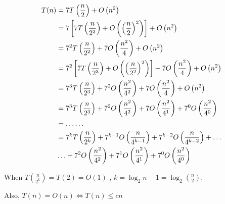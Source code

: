 \documentclass[journal]{IEEEtran}
\begin{document}
\begin{align}
  \notag
  T(n) &=7 T\left(\frac{n}{2}\right)+O\left(n^{2}\right) \\\notag
&=7\left[7 T\left(\frac{n}{2^{2}}\right)+O\left(\left(\frac{n}{2}\right)^{2}\right)\right]+O\left(n^{2}\right) \\\notag
&=7^{2} T\left(\frac{n}{2^{2}}\right)+7 O\left(\frac{n^{2}}{4}\right)+O\left(n^{2}\right) \\\notag
&=7^{2}\left[7 T\left(\frac{n}{2^{3}}\right)+O\left(\left(\frac{n}{2^{2}}\right)^{2}\right)\right]+7 O\left(\frac{n^{2}}{4}\right)+O\left(n^{2}\right) \\\notag
&=7^{3} T\left(\frac{n}{2^{3}}\right)+7^{2} O\left(\frac{n^{2}}{4^{2}}\right)+7 O\left(\frac{n^{2}}{4}\right)+O\left(n^{2}\right) \\\notag
&=7^{3} T\left(\frac{n}{2^{3}}\right)+7^{2} O\left(\frac{n^{2}}{4^{2}}\right)+7 O\left(\frac{n^{2}}{4^{1}}\right)+7^{0} O\left(\frac{n^{2}}{4^{0}}\right) \\\notag
&=\ldots \ldots \\\notag
&=7^{k} T\left(\frac{n}{2^{k}}\right)+7^{k-1} O\left(\frac{n}{4^{k-1}}\right)+7^{k-2} O\left(\frac{n}{4^{k-2}}\right)+\ldots \\ \notag
&\ldots +7^{2} O\left(\frac{n^{2}}{4^{2}}\right)+7^{1} O\left(\frac{n^{2}}{4^{1}}\right)+7^{0} O\left(\frac{n^{2}}{4^{0}}\right) \notag
\end{align}


When $T\left(\frac{n}{2^{k}}\right)=T(2)=O(1)$ , $k=\log _{2} n-1=\log _{2}\left(\frac{n}{2}\right)$.


Also, $T(n)=O(n) \Leftrightarrow T(n) \leq c n$
\end{document}
